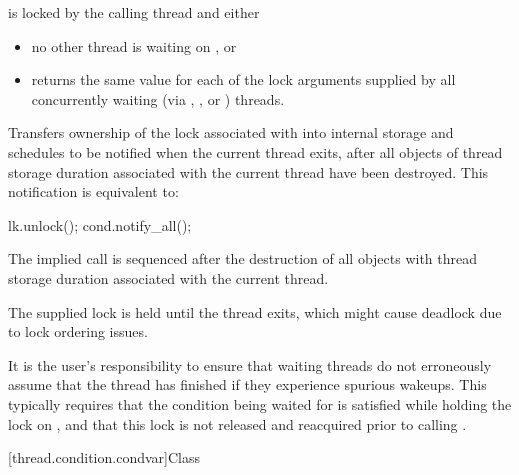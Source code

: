 \begin{itemdescr}
\pnum
\expects
{} is locked by the calling thread and either
\begin{itemize}
\item no other thread is waiting on , or
\item {} returns the same value for each of the lock arguments
supplied by all concurrently waiting (via , ,
or ) threads.
\end{itemize}

\pnum
\effects
Transfers ownership of the lock associated with  into
internal storage and schedules  to be notified when the current
thread exits, after all objects of thread storage duration associated with
the current thread have been destroyed. This notification is equivalent to:
\begin{codeblock}
lk.unlock();
cond.notify_all();
\end{codeblock}

\pnum
\sync
The implied  call is sequenced after the destruction of
all objects with thread storage duration associated with the current thread.

\pnum
\begin{note}
The supplied lock is held until the thread exits,
which might cause deadlock due to lock ordering issues.
\end{note}

\pnum
\begin{note}
It is the user's responsibility to ensure that waiting threads
do not erroneously assume that the thread has finished if they experience
spurious wakeups. This typically requires that the condition being waited
for is satisfied while holding the lock on , and that this lock
is not released and reacquired prior to calling .
\end{note}
\end{itemdescr}

[thread.condition.condvar]{Class }

